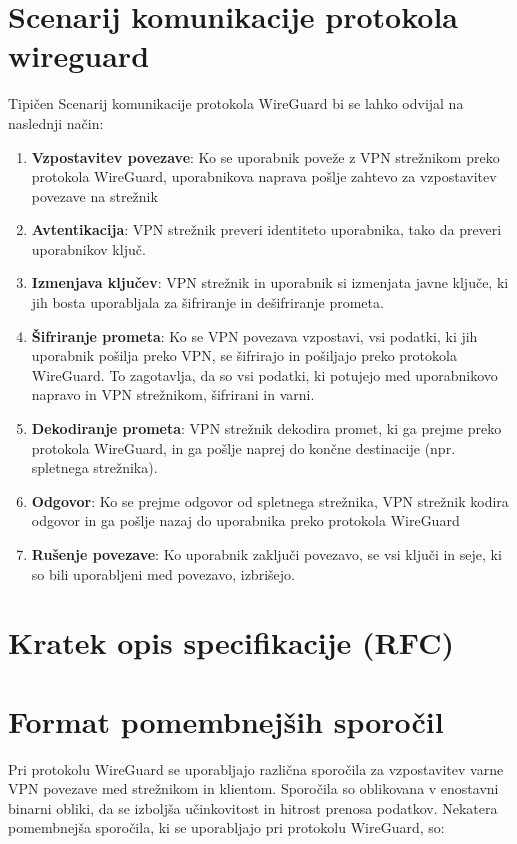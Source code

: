 \documentclass[a4paper, 11pt]{article}
\begin{document}
\section{Scenarij komunikacije protokola wireguard}
Tipičen Scenarij komunikacije protokola WireGuard bi se lahko odvijal na naslednji način:

\begin{enumerate}
    \item \textbf{Vzpostavitev povezave}: Ko se uporabnik poveže z VPN strežnikom preko protokola WireGuard, uporabnikova naprava pošlje zahtevo za vzpostavitev povezave na strežnik
    \item \textbf{Avtentikacija}: VPN strežnik preveri identiteto uporabnika, tako da preveri uporabnikov ključ.
    \item \textbf{Izmenjava ključev}: VPN strežnik in uporabnik si izmenjata javne ključe, ki jih bosta uporabljala za šifriranje in dešifriranje prometa.
    \item \textbf{Šifriranje prometa}: Ko se VPN povezava vzpostavi, vsi podatki, ki jih uporabnik pošilja preko VPN, se šifrirajo in pošiljajo preko protokola WireGuard. To zagotavlja, da so vsi podatki, ki potujejo med uporabnikovo napravo in VPN strežnikom, šifrirani in varni.
    \item \textbf{Dekodiranje prometa}: VPN strežnik dekodira promet, ki ga prejme preko protokola WireGuard, in ga pošlje naprej do končne destinacije (npr. spletnega strežnika).
    \item \textbf{Odgovor}: Ko se prejme odgovor od spletnega strežnika, VPN strežnik kodira odgovor in ga pošlje nazaj do uporabnika preko protokola WireGuard
    \item \textbf{Rušenje povezave}: Ko uporabnik zaključi povezavo, se vsi ključi in seje, ki so bili uporabljeni med povezavo, izbrišejo.
\end{enumerate}

\pagebreak

\section{Kratek opis specifikacije (RFC)}
\pagebreak

\section{Format pomembnejših sporočil}
Pri protokolu WireGuard se uporabljajo različna sporočila za vzpostavitev varne VPN povezave med strežnikom in klientom. 
Sporočila so oblikovana v enostavni binarni obliki, da se izboljša učinkovitost in hitrost prenosa podatkov.
Nekatera pomembnejša sporočila, ki se uporabljajo pri protokolu WireGuard, so:
\end{document}
